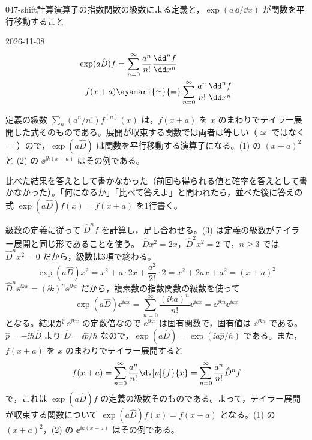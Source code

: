 \documentclass[uplatex,dvipdfmx,a4paper,11pt]{jsarticle}
\begin{document}
\begin{mondai}{047-shift}{計算}{演算子の指数関数の級数による定義と，$\exp(a\,\dd/\dd x)$ が関数を平行移動すること}
\begin{kotaeutsushi}{2026-11-08}
\begin{align*}
\exp(a\hat{D})f&=\sum_{n=0}^{\infty}\frac{a^{n}}{n!}\frac{\dd^{n}f}{\dd x^{n}}\\
f(x+a)&\ayamari{\simeq}{=}\sum_{n=0}^{\infty}\frac{a^{n}}{n!}\frac{\dd^{n}f}{\dd x^{n}}
\end{align*}
 
\end{kotaeutsushi}
\begin{kizuki}
\item 定義の級数 $\sum_{n}(a^{n}/n!)f^{(n)}(x)$ は，$f(x+a)$ を $x$ のまわりでテイラー展開した式そのものである。展開が収束する関数では両者は等しい（$\simeq$ ではなく $=$）ので，$\exp(a\hat{D})$ は関数を平行移動する演算子になる。(1) の $(x+a)^{2}$ と (2) の $\ee^{\ii k(x+a)}$ はその例である。
\item {} 比べた結果を答えとして書かなかった（前回も得られる値と確率を答えとして書かなかった）。「何になるか」「比べて答えよ」と問われたら，並べた後に答えの式 $\exp(a\hat{D})f(x)=f(x+a)$ を1行書く。
\end{kizuki}
\begin{tadashii}
\houshin 級数の定義に従って $\hat{D}^{n}f$ を計算し，足し合わせる。(3) は定義の級数がテイラー展開と同じ形であることを使う。
\keisan {} $\hat{D}x^{2}=2x$，$\hat{D}^{2}x^{2}=2$ で，$n\ge 3$ では $\hat{D}^{n}x^{2}=0$ だから，級数は3項で終わる。
\[ \exp(a\hat{D})x^{2}=x^{2}+a\cdot 2x+\frac{a^{2}}{2!}\cdot 2=x^{2}+2ax+a^{2}=(x+a)^{2} \]
 $\hat{D}^{n}\ee^{\ii kx}=(\ii k)^{n}\ee^{\ii kx}$ だから，複素数の指数関数の級数を使って
\[ \exp(a\hat{D})\ee^{\ii kx}=\sum_{n=0}^{\infty}\frac{(\ii ka)^{n}}{n!}\ee^{\ii kx}=\ee^{\ii ka}\ee^{\ii kx} \]
となる。結果が $\ee^{\ii kx}$ の定数倍なので $\ee^{\ii kx}$ は固有関数で，固有値は $\ee^{\ii ka}$ である。
 $\hat{p}=-\ii\hbar\hat{D}$ より $\hat{D}=\ii\hat{p}/\hbar$ なので，$\exp(a\hat{D})=\exp(\ii a\hat{p}/\hbar)$ である。また，$f(x+a)$ を $x$ のまわりでテイラー展開すると
\[ f(x+a)=\sum_{n=0}^{\infty}\frac{a^{n}}{n!}\dv[n]{f}{x}=\sum_{n=0}^{\infty}\frac{a^{n}}{n!}\hat{D}^{n}f \]
で，これは $\exp(a\hat{D})f$ の定義の級数そのものである。よって，テイラー展開が収束する関数について $\exp(a\hat{D})f(x)=f(x+a)$ となる。(1) の $(x+a)^{2}$，(2) の $\ee^{\ii k(x+a)}$ はその例である。

\end{tadashii}
\end{mondai}
\end{document}
